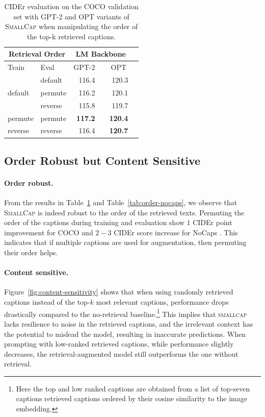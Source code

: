 \begin{table}[t]
\centering
\renewcommand{\arraystretch}{1.1}
     \begin{tabular}{llrrrr}
        \multicolumn{2}{c}{Retrieval Order} & \multicolumn{3}{c}{LM Backbone}\\
        \midrule
        Train & Eval & \multicolumn{1}{c}{GPT-2} & & \multicolumn{1}{c}{OPT} \\
        \midrule
        \multirow{3}{*}{default}
        & default & 116.4 & & 120.3 \\
        & permute & 116.2 & & 120.1 \\
        & reverse & 115.8	& & 119.7 \\
        \midrule
        permute & permute & \textbf{117.2} & & \textbf{120.4} \\
        reverse & reverse & 116.4 & & \textbf{120.7}	\\ 
        \bottomrule
        \end{tabular}
    \caption{CIDEr evaluation on the COCO validation set with GPT-2 and OPT variants of \textsc{SmallCap} when manipulating the order of the top-k retrieved captions. } \label{tab:order-coco}
\end{table}

\subsection{Order Robust but Content Sensitive}

    \paragraph{Order robust.} From the results in Table~\ref{tab:order-coco} and Table~\ref{tab:order-nocaps}, we observe that \textsc{SmallCap} is indeed robust to the order of the retrieved texts. Permuting the order of the captions during training and evaluation show $1$ CIDEr point improvement for COCO \citep{lin2014microsoft} and $2-3$ CIDEr score increase for NoCaps \citep{agrawal2019nocaps}. This indicates that if multiple captions are used for augmentation, then permuting their order helps. 

    \paragraph{Content sensitive.}
    \label{para:content-sensitive}
    Figure~\ref{fig:content-sensitivity} shows that when using randomly retrieved captions instead of the top-$k$ most relevant captions, performance drops drastically compared to the no-retrieval baseline.\footnote{Here the top and low ranked captions are obtained from a list of top-seven captions retrieved captions ordered by their cosine similarity to the image embedding.} This implies that \textsc{smallcap} lacks resilience to noise in the retrieved captions, and the irrelevant context has the potential to mislead the model, resulting in inaccurate predictions. When prompting with low-ranked retrieved captions, while performance slightly decreases, the retrieval-augmented model still outperforms the one without retrieval.


